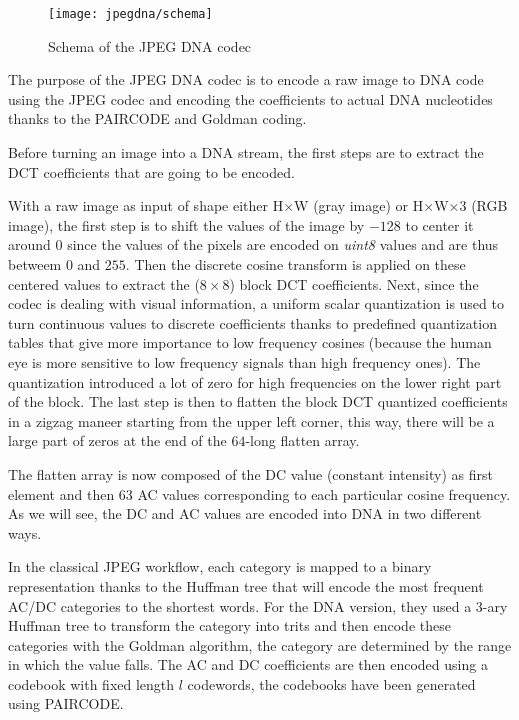 \begin{figure}
    \centering
    \texttt{[image: jpegdna/schema]}
    \caption{Schema of the JPEG DNA codec}
    \label{fig:jpegdna}
\end{figure}

The purpose of the JPEG DNA codec is to encode a raw image to DNA code using the JPEG codec and encoding the coefficients to actual DNA nucleotides thanks to the PAIRCODE and Goldman coding.

Before turning an image into a DNA stream, the first steps are to extract the DCT coefficients that are going to be encoded. 

With a raw image as input of shape either H$\times$W (gray image) or H$\times$W$\times$3 (RGB image), the first step is to shift the values of the image by $-128$ to center it around $0$ since the values of the pixels are encoded on \textit{uint8} values and are thus betweem $0$ and $255$. Then the discrete cosine transform is applied on these centered values to extract the ($8\times8$) block DCT coefficients. Next, since the codec is dealing with visual information, a uniform scalar quantization is used to turn continuous values to discrete coefficients thanks to predefined quantization tables that give more importance to low frequency cosines (because the human eye is more sensitive to low frequency signals than high frequency ones).  The quantization introduced a lot of zero for high frequencies on the lower right part of the block. The last step is then to flatten the block DCT quantized coefficients in a zigzag maneer starting from the upper left corner, this way, there will be a large part of zeros at the end of the $64$-long flatten array. 

The flatten array is now composed of the DC value (constant intensity) as first element and then 63 AC values corresponding to each particular cosine frequency. As we will see, the DC and AC values are encoded into DNA in two different ways.

In the classical JPEG workflow, each category is mapped to a binary representation thanks to the Huffman tree that will encode the most frequent AC/DC categories to the shortest words. 
For the DNA version, they used a 3-ary Huffman tree to transform the category into trits and then encode these categories with the Goldman algorithm, the category are determined by the range in which the value falls.
The AC and DC coefficients are then encoded using a codebook with fixed length $l$ codewords, the codebooks have been generated using PAIRCODE.

